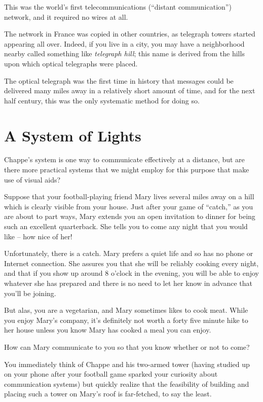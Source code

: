 \documentclass{book}
\begin{document}
This was the world's first telecommunications (``distant communication'') network, and it required no wires at all.

The network in France was copied in other countries, as telegraph towers started appearing all over. Indeed, if you live in a city, you may have a neighborhood nearby called something like \emph{telegraph hill}; this name is derived from the hills upon which optical telegraphs were placed.

The optical telegraph was the first time in history that messages could be delivered many miles away in a relatively short amount of time, and for the next half century, this was the only systematic method for doing so.

\section{A System of Lights}

Chappe's system is one way to communicate effectively at a distance, but are there more practical systems that we might employ for this purpose that make use of visual aids?

Suppose that your football-playing friend Mary lives several miles away on a hill which is clearly visible from your house. Just after your game of ``catch,'' as you are about to part ways, Mary extends you an open invitation to dinner for being such an excellent quarterback. She tells you to come any night that you would like -- how nice of her!

Unfortunately, there is a catch. Mary prefers a quiet life and so has no phone or Internet connection. She assures you that she will be reliably cooking every night, and that if you show up around 8 o'clock in the evening, you will be able to enjoy whatever she has prepared and there is no need to let her know in advance that you'll be joining.

But alas, you are a vegetarian, and Mary sometimes likes to cook meat. While you enjoy Mary's company, it's definitely not worth a forty five minute hike to her house unless you know Mary has cooked a meal you can enjoy.

How can Mary communicate to you so that you know whether or not to come?

You immediately think of Chappe and his two-armed tower (having studied up on your phone after your football game sparked your curiosity about communication systems) but quickly realize that the feasibility of building and placing such a tower on Mary's roof is far-fetched, to say the least.
\end{document}
